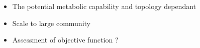 \documentclass[8pt]{beamer}
\begin{document}
\begin{frame}
{\begin{minipage}{0.5\textwidth}
\end{minipage}
\begin{block}{}
\begin{itemize}
\item The potential metabolic capability and topology dependant
\item Scale to large community \tiny \citep{Belcour.2020,Frioux2018}
\item \normalsize Assessment of objective function ?
\end{itemize}
\end{block}

}

\end{frame}
\end{document}
